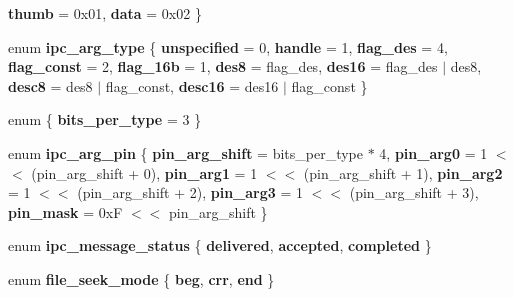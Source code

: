 \begin{DoxyCompactItemize}
{\bfseries thumb} = 0x01, 
{\bfseries data} = 0x02
 \}
\item 
\mbox{\label{namespaceeka2l1_a2df6bad8a88d4d6cfa7060bcd2451577}} 
enum {\bfseries ipc\+\_\+arg\+\_\+type} \{ \newline
{\bfseries unspecified} = 0, 
{\bfseries handle} = 1, 
{\bfseries flag\+\_\+des} = 4, 
{\bfseries flag\+\_\+const} = 2, 
\newline
{\bfseries flag\+\_\+16b} = 1, 
{\bfseries des8} = flag\+\_\+des, 
{\bfseries des16} = flag\+\_\+des $\vert$ des8, 
{\bfseries desc8} = des8 $\vert$ flag\+\_\+const, 
\newline
{\bfseries desc16} = des16 $\vert$ flag\+\_\+const
 \}
\item 
\mbox{\label{namespaceeka2l1_a5c5e822fe692e5036d3a39a21ba788c3}} 
enum \{ {\bfseries bits\+\_\+per\+\_\+type} = 3
 \}
\item 
\mbox{\label{namespaceeka2l1_ad2ef20da7c91ba85866d9c19ea28b0bb}} 
enum {\bfseries ipc\+\_\+arg\+\_\+pin} \{ \newline
{\bfseries pin\+\_\+arg\+\_\+shift} = bits\+\_\+per\+\_\+type $\ast$ 4, 
{\bfseries pin\+\_\+arg0} = 1 $<$$<$ (pin\+\_\+arg\+\_\+shift + 0), 
{\bfseries pin\+\_\+arg1} = 1 $<$$<$ (pin\+\_\+arg\+\_\+shift + 1), 
{\bfseries pin\+\_\+arg2} = 1 $<$$<$ (pin\+\_\+arg\+\_\+shift + 2), 
\newline
{\bfseries pin\+\_\+arg3} = 1 $<$$<$ (pin\+\_\+arg\+\_\+shift + 3), 
{\bfseries pin\+\_\+mask} = 0xF $<$$<$ pin\+\_\+arg\+\_\+shift
 \}
\item 
\mbox{\label{namespaceeka2l1_a45c5c7ed7b807c39d1175b43db548194}} 
enum {\bfseries ipc\+\_\+message\+\_\+status} \{ {\bfseries delivered}, 
{\bfseries accepted}, 
{\bfseries completed}
 \}
\item 
\mbox{\label{namespaceeka2l1_ade88bbec995245932ba1fa841ae721f0}} 
enum {\bfseries file\+\_\+seek\+\_\+mode} \{ {\bfseries beg}, 
{\bfseries crr}, 
{\bfseries end}
 \}
\end{DoxyCompactItemize}

